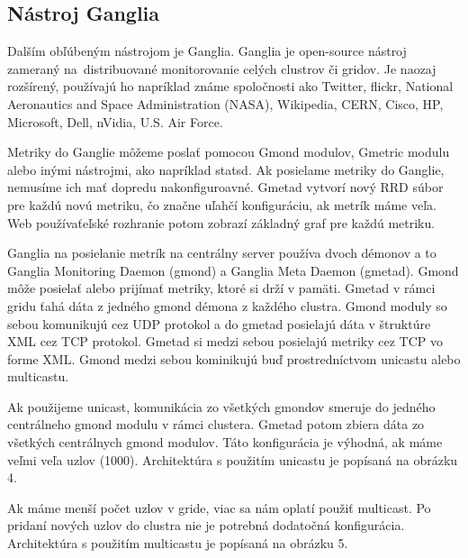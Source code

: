 \documentclass[a4paper, usesections, upjsfrontpage, thesismargins, thesislinespacing]{rnthesis}
\begin{document}
\subsection{Nástroj Ganglia}

Dalším obľúbeným nástrojom je Ganglia.
Ganglia je open-source nástroj zameraný na~distribuované monitorovanie celých clustrov či gridov.
Je naozaj rozšírený, používajú ho napríklad známe spoločnosti ako Twitter, flickr, National Aeronautics and Space Administration (NASA), Wikipedia, CERN, Cisco, HP, Microsoft, Dell, nVidia, U.S. Air Force.

Metriky do Ganglie môžeme poslať pomocou Gmond modulov, Gmetric modulu alebo inými nástrojmi, ako napríklad statsd.
Ak posielame metriky do Ganglie, nemusíme ich mať dopredu nakonfiguroavné.
Gmetad vytvorí nový RRD súbor pre každú novú metriku, čo značne uľahčí konfiguráciu, ak metrík máme veľa.
Web používaťeľské rozhranie potom zobrazí základný graf pre každú metriku.

Ganglia na posielanie metrík na centrálny server používa dvoch démonov a to Ganglia Monitoring Daemon (gmond) a Ganglia Meta Daemon (gmetad).
Gmond môže posielať alebo prijímať metriky, ktoré si drží v pamäti.
Gmetad v rámci gridu ťahá dáta z jedného gmond démona z každého clustra.
Gmond moduly so sebou komunikujú cez UDP protokol a do gmetad posielajú dáta v štruktúre XML cez TCP protokol.
Gmetad si medzi sebou posielajú metriky cez TCP vo forme XML.
Gmond medzi sebou kominikujú buď prostredníctvom unicastu alebo multicastu.

Ak použijeme unicast, komunikácia zo všetkých gmondov smeruje do jedného centrálneho gmond modulu v rámci clustera.
Gmetad potom zbiera dáta zo všetkých centrálnych gmond modulov.
Táto konfigurácia je výhodná, ak máme veľmi veľa uzlov (1000).
Architektúra s použitím unicastu je popísaná na obrázku 4.

Ak máme menší počet uzlov v gride, viac sa nám oplatí použiť multicast.
Po pridaní nových uzlov do clustra nie je potrebná dodatočná konfigurácia.
Architektúra s použitím multicastu je popísaná na obrázku 5.
\end{document}
